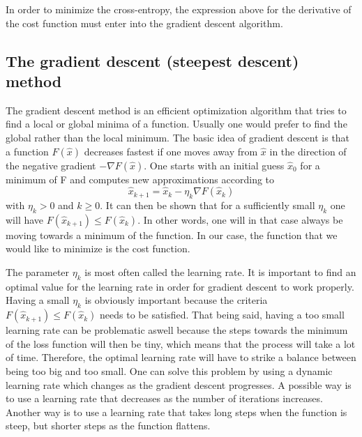 \documentclass[a4paper,12pt]{article}
\begin{document}
In order to minimize the cross-entropy, the expression above for the derivative of the cost function must enter into the gradient descent algorithm.

\subsection{The gradient descent (steepest descent) method}
The gradient descent method is an efficient optimization algorithm that tries to find a local or global minima of a function. Usually one would prefer to find the global rather than the local minimum. The basic idea of gradient descent is that a function $F(\hat{x})$ decreases fastest if one moves away from $\hat{x}$ in the direction of the negative gradient $-\nabla F(\hat{x})$.\newline
One starts with an initial guess $\hat{x}_0$ for a minimum of F and computes new approximations according to
\begin{equation}
    \hat{x}_{k+1} = \hat{x}_k - \eta_k \nabla F(\hat{x}_k)
\end{equation}
with $\eta_k > 0$ and $k \geq 0$. It can then be shown that for a sufficiently small $\eta_k$ one will have $F(\hat{x}_{k+1}) \leq F(\hat{x}_k)$. In other words, one will in that case always be moving towards a minimum of the function.\newline
In our case, the function that we would like to minimize is the cost function.\newline

The parameter $\eta_k$ is most often called the learning rate. It is important to find an optimal value for the learning rate in order for gradient descent to work properly. Having a small $\eta_k$ is obviously important because the criteria $F(\hat{x}_{k+1}) \leq F(\hat{x}_k)$ needs to be satisfied. That being said, having a too small learning rate can be problematic aswell because the steps towards the minimum of the loss function will then be tiny, which means that the process will take a lot of time. Therefore, the optimal learning rate will have to strike a balance between being too big and too small.\newline
One can solve this problem by using a dynamic learning rate which changes as the gradient descent progresses. A possible way is to use a learning rate that decreases as the number of iterations increases. Another way is to use a learning rate that takes long steps when the function is steep, but shorter steps as the function flattens.\newline
\end{document}
